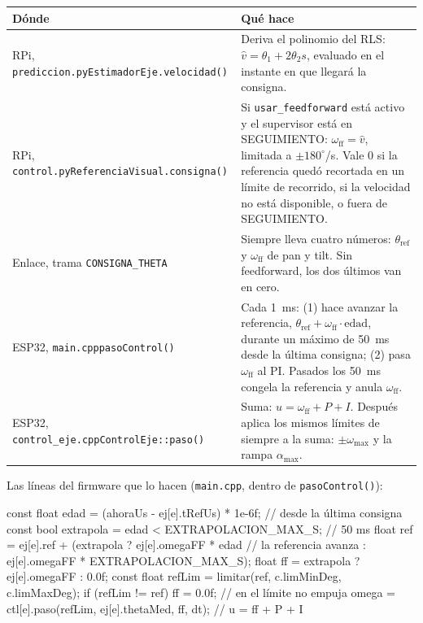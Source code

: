 \documentclass[11pt,a4paper]{article}
\newcommand{\cod}[1]{\texttt{#1}}
\newcommand{\gr}{^{\circ}}
\begin{document}
\begin{table}[H]
\small
\begin{tabularx}{\linewidth}{@{}>{\raggedright\arraybackslash}p{4.8cm}>{\raggedright\arraybackslash}X@{}}
\toprule
Dónde & Qué hace \\
\midrule
RPi, \cod{prediccion.py}\newline\cod{EstimadorEje.velocidad()} & Deriva el polinomio del RLS: $\hat v = \theta_1 + 2\theta_2 s$, evaluado en el instante en que llegará la consigna. \\
RPi, \cod{control.py}\newline\cod{ReferenciaVisual.consigna()} & Si \cod{usar\_feedforward} está activo y el supervisor está en SEGUIMIENTO: $\omega_{\mathrm{ff}} = \hat v$, limitada a $\pm 180\gr$/s. Vale 0 si la referencia quedó recortada en un límite de recorrido, si la velocidad no está disponible, o fuera de SEGUIMIENTO. \\
Enlace, trama \cod{CONSIGNA\_THETA} & Siempre lleva cuatro números: $\theta_{\mathrm{ref}}$ y $\omega_{\mathrm{ff}}$ de pan y tilt. Sin feedforward, los dos últimos van en cero. \\
ESP32, \cod{main.cpp}\newline\cod{pasoControl()} & Cada 1~ms: (1) hace avanzar la referencia, $\theta_{\mathrm{ref}} + \omega_{\mathrm{ff}}\cdot\text{edad}$, durante un máximo de 50~ms desde la última consigna; (2) pasa $\omega_{\mathrm{ff}}$ al PI. Pasados los 50~ms congela la referencia y anula $\omega_{\mathrm{ff}}$. \\
ESP32, \cod{control\_eje.cpp}\newline\cod{ControlEje::paso()} & Suma: $u = \omega_{\mathrm{ff}} + P + I$. Después aplica los mismos límites de siempre a la suma: $\pm\omega_{\max}$ y la rampa $\alpha_{\max}$. \\
\bottomrule
\end{tabularx}
\end{table}

Las líneas del firmware que lo hacen (\cod{main.cpp}, dentro de \cod{pasoControl()}):

\begin{codigo}
const float edad = (ahoraUs - ej[e].tRefUs) * 1e-6f;     // desde la última consigna
const bool extrapola = edad < EXTRAPOLACION_MAX_S;        // 50 ms
float ref = ej[e].ref + (extrapola ? ej[e].omegaFF * edad // la referencia avanza
                                   : ej[e].omegaFF * EXTRAPOLACION_MAX_S);
float ff  = extrapola ? ej[e].omegaFF : 0.0f;
const float refLim = limitar(ref, c.limMinDeg, c.limMaxDeg);
if (refLim != ref) ff = 0.0f;                             // en el límite no empuja
omega = ctl[e].paso(refLim, ej[e].thetaMed, ff, dt);      // u = ff + P + I
\end{codigo}
\end{document}
